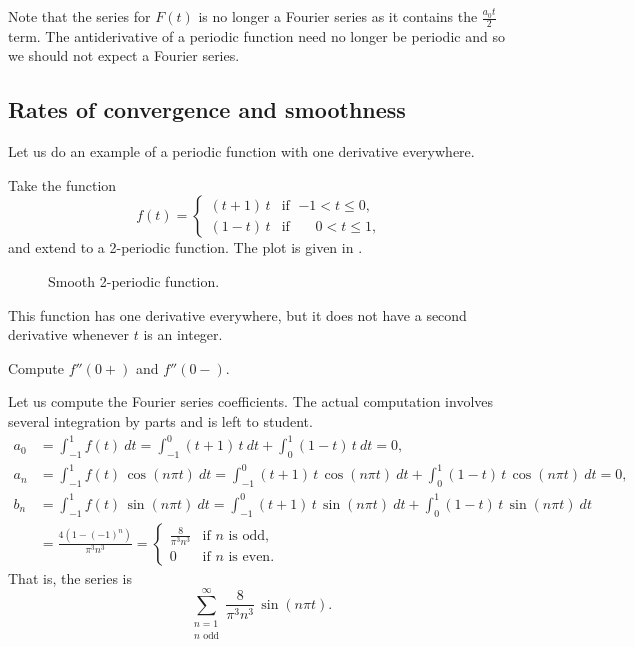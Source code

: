 \documentclass[12pt]{book}
\begin{document}
Note that the series for $F(t)$ is no longer a Fourier series as it contains
the $\frac{a_0 t}{2}$ term.  The antiderivative
of a periodic function need no longer be periodic and so we should not
expect a Fourier series.

\subsection{Rates of convergence and smoothness}

Let us do an example of a periodic function with one derivative everywhere.

\begin{example}
Take the function
\begin{equation*}
f(t) =
\begin{cases}
(t+1)\,t & \text{if } \; {-1} < t \leq 0 , \\
(1-t)\,t & \text{if } \; \phantom{-}0 < t \leq 1 ,
\end{cases}
\end{equation*}
and extend to a
2-periodic function.  The plot is given in
.

\begin{figure}[h!t]
\capstart
\begin{center}
\caption{Smooth 2-periodic function.\label{gfs:smoothexfig}}
\end{center}
\end{figure}

This function has one derivative everywhere, but it
does not have a second derivative whenever $t$ is an integer.

\begin{exercise}
Compute $f''(0+)$ and $f''(0-)$.
\end{exercise}

Let us compute the Fourier series coefficients.  The actual computation
involves several integration by parts and is left to student.
\begin{align*}
a_0 & = 
\int_{-1}^1
f(t) ~ dt = 
\int_{-1}^0
(t+1)\,t ~ dt +
\int_0^1
(1-t)\,t ~ dt = 0 , \\
a_n & = 
\int_{-1}^1
f(t) \, \cos (n\pi t) ~ dt = 
\int_{-1}^0
(t+1)\,t
\, \cos (n \pi t) ~ dt +
\int_0^1
(1-t)\,t
\, \cos (n \pi t) ~ dt = 0, \\
b_n & = 
\int_{-1}^1
f(t) \, \sin (n\pi t) ~ dt = 
\int_{-1}^0
(t+1)\,t
\, \sin (n \pi t) ~ dt +
\int_0^1
(1-t)\,t
\, \sin (n \pi t) ~ dt \\
& =
\frac{4 ( 1-{(-1)}^n)}{\pi^3 n^3} 
=
\begin{cases}
\frac{8}{\pi^3 n^3} & \text{if } n \text{ is odd} , \\
0 & \text{if } n \text{ is even} .
\end{cases}
\end{align*}
That is, the series is
\begin{equation*}
\sum_{\substack{n=1 \\ n \text{ odd}}}^\infty \frac{8}{\pi^3 n^3} \, \sin (n \pi t) .
\end{equation*}


\end{example}
\end{document}
